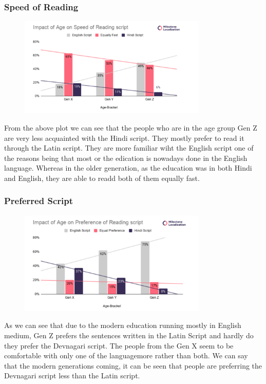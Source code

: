 \documentclass{article}
\begin{document}
\subsubsection{Speed of Reading}

\begin{figure}[H]
    \centering
    \includegraphics[width=0.8\textwidth]{plots/age_faster_read.png}
\end{figure}

From the above plot we can see that the people who are in the age group Gen Z are very less acquainted with the Hindi script. They mostly prefer to read it through the Latin script. They are more familiar wiht the English script one of the reasons being that most or the edication is nowadays done in the English language. Whereas in the older generation, as the education was in both Hindi and English, they are able to readd both of them equally fast. 

\subsubsection{Preferred Script}

\begin{figure}[H]
    \centering
    \includegraphics[width=0.8\textwidth]{plots/age_preferred_script.png}
\end{figure}

As we can see that due to the modern education running mostly in English medium, Gen Z prefers the sentences written in the Latin Script and hardly do they prefer the Devnagari script. The people from the Gen X seem to be comfortable with only one of the languagemore rather than both. We can say that the modern generations coming, it can be seen that people are preferring the Devnagari script less than the Latin script. 
\end{document}
